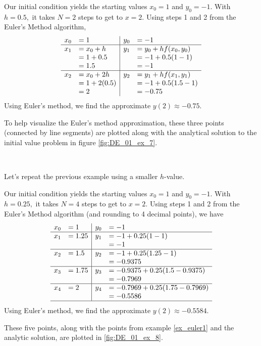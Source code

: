 {Our initial condition yields the starting values $x_0 = 1$ and $y_0 = -1$.  With $h = 0.5,$ it takes $N=2$ steps to get to $x=2.$  Using steps 1 and 2 from the Euler's Method algorithm,
\[
\begin{array}{rl | rl}
x_0  &= 1			& 	y_0	&= -1\\ \hline
x_1 	&= x_0 + h 	& 	y_1 	&= y_0 + hf(x_0,y_0)\\
	&= 1 + 0.5	 	&		&= -1 + 0.5(1 - 1)\\
	&= 1.5		&		&= -1\\ \hline
x_2	&= x_0 + 2h	&	y_2	&= y_1 + hf(x_1,y_1)\\
	&= 1 + 2(0.5)	&		&= -1 + 0.5(1.5 -1)\\
	&= 2			&		&= -0.75
\end{array}
\]
Using Euler's method, we find the approximate $y(2) \approx -0.75.$

To help visualize the Euler's method approximation, these three points (connected by line segments) are plotted along with the analytical solution to the initial value problem in figure \ref{fig:DE_01_ex_7}.
}\\


Let's repeat the previous example using a smaller $h$-value.\\

{Our initial condition yields the starting values $x_0 = 1$ and $y_0 = -1$.  With $h = 0.25,$ it takes $N=4$ steps to get to $x=2.$  Using steps 1 and 2 from the Euler's Method algorithm (and rounding to 4 decimal points), we have
\[
\begin{array}{rl | rl}
x_0  &= 1			& 	y_0	&= -1\\ \hline
x_1 	&= 1.25		&	y_1 	&= -1 + 0.25(1 - 1)\\
	&			&		&= -1\\ \hline
x_2 	&= 1.5 		& 	y_2 	&= -1 + 0.25(1.25-1)\\
	&			&		&= -0.9375\\ \hline
x_3	&= 1.75		&	y_3 	&= -0.9375 + 0.25(1.5-0.9375)\\
	&			&		&= -0.7969\\ \hline
x_4	&= 2			&	y_4	&= -0.7969 + 0.25(1.75 - 0.7969)\\
	&			&		&= -0.5586\\ \hline
\end{array}
\]
Using Euler's method, we find the approximate $y(2) \approx -0.5584.$

These five points, along with the points from example \ref{ex_euler1} and the analytic solution, are plotted in \ref{fig:DE_01_ex_8}.
}\\

